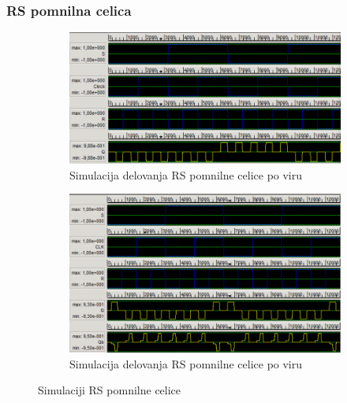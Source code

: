 \documentclass[a4paper, 11pt]{article}
\begin{document}
\subsubsection{RS pomnilna celica}
\begin{figure}[h!]
	\begin{subfigure}[b]{\textwidth}
	\includegraphics[width=\textwidth]{../img/vir_4/sim_sr.png}
	\caption{Simulacija delovanja RS pomnilne celice po viru \cite{quantum_dot}}
	\label{fig-rs-1-sim}
	\end{subfigure}
	\begin{subfigure}[b]{\textwidth}
	\includegraphics[width=\textwidth]{../img/vir_5/sim_rs.png}
	\caption{Simulacija delovanja RS pomnilne celice po viru \cite{a_novel_approach}}
	\label{fig-rs-2-sim}
	\end{subfigure}
	\caption{Simulaciji RS pomnilne celice}
	\label{fig-rs-sim}
\end{figure}
\end{document}
